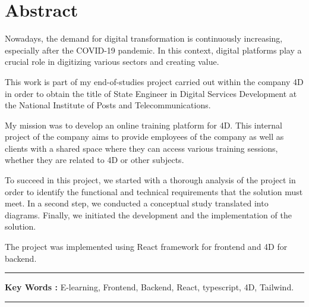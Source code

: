 \chapter*{Abstract}

Nowadays, the demand for digital transformation is continuously increasing, especially after the COVID-19 pandemic. In this context, digital platforms play a crucial role in digitizing various sectors and creating value.

\vspace{10pt}


This work is part of my end-of-studies project carried out within the company 4D in order to obtain the title of State Engineer in Digital Services Development at the National Institute of Posts and Telecommunications.

\vspace{10pt}

My mission was to develop an online training platform for 4D. This internal project of the company aims to provide employees of the company as well as clients with a shared space where they can access various training sessions, whether they are related to 4D or other subjects.

\vspace{10pt}

To succeed in this project, we started with a thorough analysis of the project in order to identify the functional and technical requirements that the solution must meet. In a second step, we conducted a conceptual study translated into diagrams. Finally, we initiated the development and the implementation of the solution.

\vspace{10pt}

The project was implemented using React framework for frontend and 4D for backend.

\vspace{10pt}

\noindent\rule[2pt]{\textwidth}{0.5pt}

{\textbf{Key Words :}}
E-learning, Frontend, Backend, React, typescript, 4D, Tailwind.
\\
\noindent\rule[2pt]{\textwidth}{0.5pt}